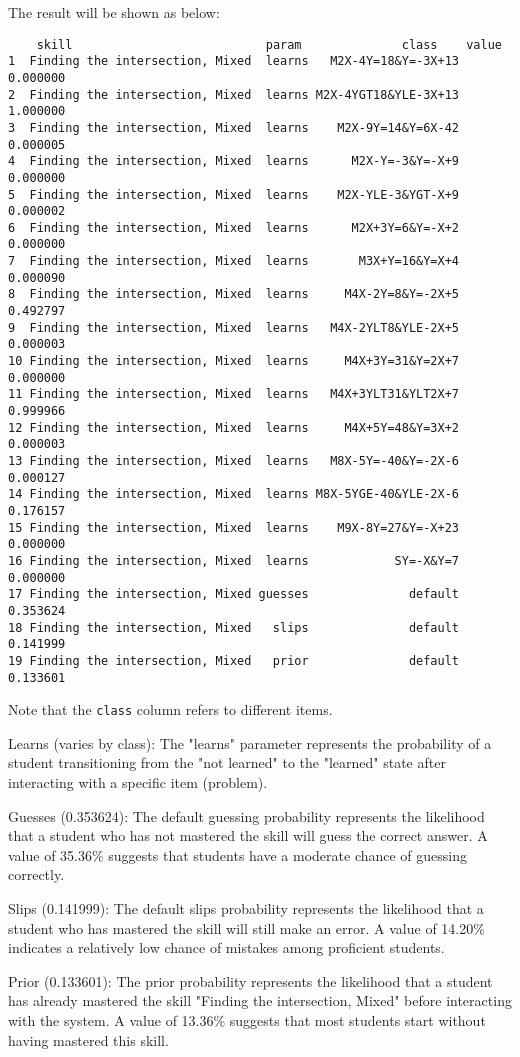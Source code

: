 \documentclass{article}
\begin{document}
The result will be shown as below:

\begin{verbatim}
    skill                           param              class    value
1  Finding the intersection, Mixed  learns   M2X-4Y=18&Y=-3X+13 0.000000
2  Finding the intersection, Mixed  learns M2X-4YGT18&YLE-3X+13 1.000000
3  Finding the intersection, Mixed  learns    M2X-9Y=14&Y=6X-42 0.000005
4  Finding the intersection, Mixed  learns      M2X-Y=-3&Y=-X+9 0.000000
5  Finding the intersection, Mixed  learns    M2X-YLE-3&YGT-X+9 0.000002
6  Finding the intersection, Mixed  learns      M2X+3Y=6&Y=-X+2 0.000000
7  Finding the intersection, Mixed  learns       M3X+Y=16&Y=X+4 0.000090
8  Finding the intersection, Mixed  learns     M4X-2Y=8&Y=-2X+5 0.492797
9  Finding the intersection, Mixed  learns   M4X-2YLT8&YLE-2X+5 0.000003
10 Finding the intersection, Mixed  learns     M4X+3Y=31&Y=2X+7 0.000000
11 Finding the intersection, Mixed  learns   M4X+3YLT31&YLT2X+7 0.999966
12 Finding the intersection, Mixed  learns     M4X+5Y=48&Y=3X+2 0.000003
13 Finding the intersection, Mixed  learns   M8X-5Y=-40&Y=-2X-6 0.000127
14 Finding the intersection, Mixed  learns M8X-5YGE-40&YLE-2X-6 0.176157
15 Finding the intersection, Mixed  learns    M9X-8Y=27&Y=-X+23 0.000000
16 Finding the intersection, Mixed  learns            SY=-X&Y=7 0.000000
17 Finding the intersection, Mixed guesses              default 0.353624
18 Finding the intersection, Mixed   slips              default 0.141999
19 Finding the intersection, Mixed   prior              default 0.133601
\end{verbatim}
Note that the \texttt{class} column refers to different items.

Learns (varies by class): The "learns" parameter represents the probability of a student transitioning from the "not learned" to the "learned" state after interacting with a specific item (problem).

Guesses (0.353624): The default guessing probability represents the likelihood that a student who has not mastered the skill will guess the correct answer. A value of 35.36\% suggests that students have a moderate chance of guessing correctly.

Slips (0.141999): The default slips probability represents the likelihood that a student who has mastered the skill will still make an error. A value of 14.20\% indicates a relatively low chance of mistakes among proficient students.

Prior (0.133601): The prior probability represents the likelihood that a student has already mastered the skill "Finding the intersection, Mixed" before interacting with the system. A value of 13.36\% suggests that most students start without having mastered this skill.
\end{document}
